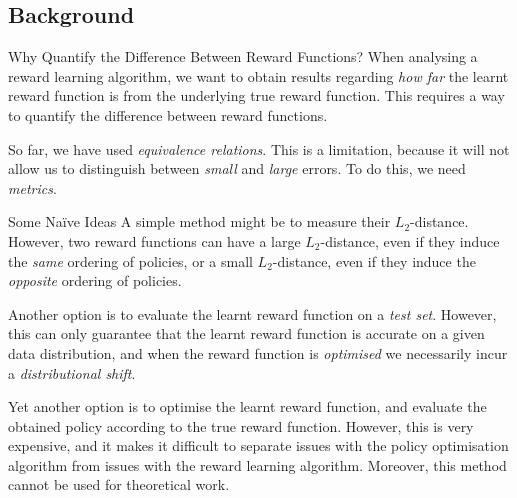 \documentclass{beamer}
\begin{document}
\subsection{Background}

\begin{frame}{Why Quantify the Difference Between Reward Functions?}
    \small
    When analysing a reward learning algorithm, we want to obtain results regarding \emph{how far} the learnt reward function is from the underlying true reward function. This requires a way to quantify the difference between reward functions.
    
    \vspace{0.5cm}
    So far, we have used \emph{equivalence relations}. This is a limitation, because it will not allow us to distinguish between \emph{small} and \emph{large} errors. To do this, we need \emph{metrics}.
\end{frame}

\begin{frame}{Some Na\"ive Ideas}
    \small
    A simple method might be to measure their $L_2$-distance. However, two reward functions can have a large $L_2$-distance, even if they induce the \emph{same} ordering of policies, or a small $L_2$-distance, even if they induce the \emph{opposite} ordering of policies.
    
    \vspace{0.3cm}
    Another option is to evaluate the learnt reward function on a \emph{test set}. However, this can only guarantee that the learnt reward function is accurate on a given data distribution, and when the reward function is \emph{optimised} we necessarily incur a \emph{distributional shift}.
    
    \vspace{0.3cm}
    Yet another option is to optimise the learnt reward function, and evaluate the obtained policy according to the true reward function. However, this is very expensive, and it makes it difficult to separate issues with the policy optimisation algorithm from issues with the reward learning algorithm. Moreover, this method cannot be used for theoretical work. 
\end{frame}

\end{document}
